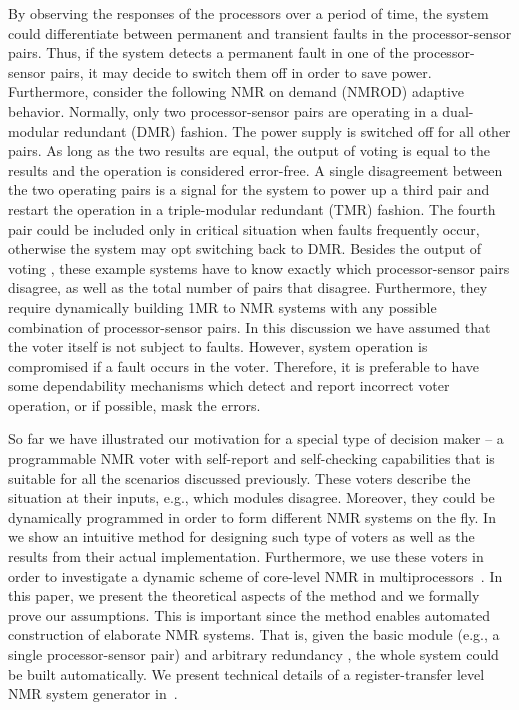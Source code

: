 \documentclass[technote, a4paper, onecolumn]{IEEEtran}  \newcommand{\avtor}{Aleksandar Simevski}
\begin{document}
By observing the responses of the processors over a period of time, the system could differentiate between permanent and transient faults in the processor-sensor pairs. Thus, if the system detects a permanent fault in one of the processor-sensor pairs, it may decide to switch them off in order to save power. Furthermore, consider the following NMR on demand (NMROD) adaptive behavior. Normally, only two processor-sensor pairs are operating in a dual-modular redundant (DMR) fashion. The power supply is switched off for all other pairs. As long as the two results are equal, the output of voting is equal to the results and the operation is considered error-free. A single disagreement between the two operating pairs is a signal for the system to power up a third pair and restart the operation in a triple-modular redundant (TMR) fashion. The fourth pair could be included only in critical situation when faults frequently occur, otherwise the system may opt  switching back to DMR. Besides the output of voting , these example systems have to know exactly which processor-sensor pairs disagree, as well as the total number of pairs that disagree. Furthermore, they require dynamically building 1MR to NMR systems with any possible combination of processor-sensor pairs. In this discussion we have assumed that the voter itself is not subject to faults. However, system operation is compromised if a fault occurs in the voter. Therefore, it is preferable to have some dependability mechanisms which detect and report incorrect voter operation, or if possible, mask the errors.

So far we have illustrated our motivation for a special type of decision maker -- a programmable NMR voter with self-report and self-checking capabilities that is suitable for all the scenarios discussed previously. These voters describe the situation at their inputs, e.g., which modules disagree. Moreover, they could be dynamically programmed in order to form different NMR systems on the fly. In \cite{Simevski2012a} we show an intuitive method for designing such type of voters as well as the results from their actual implementation. Furthermore, we use these voters in order to investigate a dynamic scheme of core-level NMR in multiprocessors~\cite{Simevski2014a}. In this paper, we present the theoretical aspects of the method and we formally prove our assumptions. This is important since the method enables automated construction of elaborate NMR systems. That is, given the basic module (e.g., a single processor-sensor pair) and arbitrary redundancy , the whole system could be built automatically. We present technical details of a register-transfer level NMR system generator in~\cite{Simevski2013a}.
\end{document}
